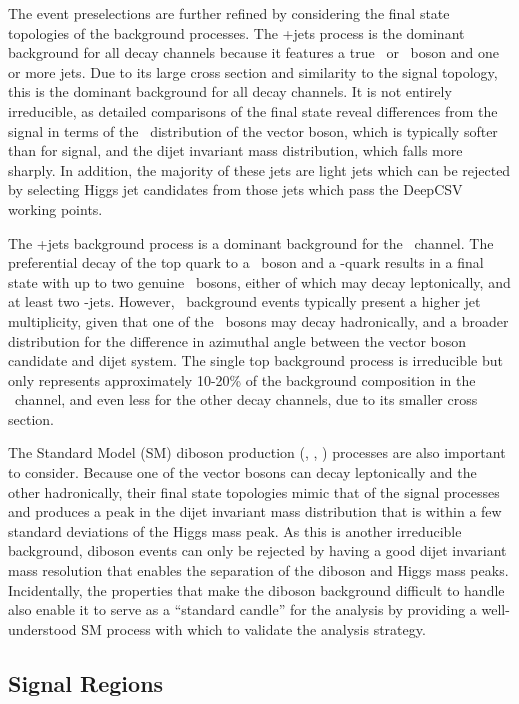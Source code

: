 The event preselections are further refined by considering the final state topologies of the background processes. The \bosV+jets process is the dominant background for all decay channels because it features a true \bosW\ or \bosZ\ boson and one or more jets. Due to its large cross section and similarity to the signal topology, this is the dominant background for all decay channels. It is not entirely irreducible, as detailed comparisons of the final state reveal differences from the signal in terms of the \pT\ distribution of the vector boson, which is typically softer than for signal, and the dijet invariant mass distribution, which falls more sharply. In addition, the majority of these jets are light jets which can be rejected by selecting Higgs jet candidates from those jets which pass the DeepCSV working points.

The \qrkt\qrktbar+jets background process is a dominant background for the \WlnH\ channel. The preferential decay of the top quark to a \bosW\ boson and a \qrkb-quark results in a final state with up to two genuine \bosW\ bosons, either of which may decay leptonically, and at least two \qrkb-jets. However, \qrkt\qrktbar\ background events typically present a higher jet multiplicity, given that one of the \bosW\ bosons may decay hadronically, and a broader distribution for the difference in azimuthal angle between the vector boson candidate and dijet system. The single top background process is irreducible but only represents approximately 10-20\% of the background composition in the \WlnH\ channel, and even less for the other decay channels, due to its smaller cross section.

The Standard Model (SM) diboson production (\bosW\bosW, \bosW\bosZ, \bosZ\bosZ) processes are also important to consider. Because one of the vector bosons can decay leptonically and the other hadronically, their final state topologies mimic that of the signal processes and produces a peak in the dijet invariant mass distribution that is within a few standard deviations of the Higgs mass peak. As this is another irreducible background, diboson events can only be rejected by having a good dijet invariant mass resolution that enables the separation of the diboson and Higgs mass peaks. Incidentally, the properties that make the diboson background difficult to handle also enable it to serve as a ``standard candle'' for the analysis by providing a well-understood SM process with which to validate the analysis strategy. 

\subsection{Signal Regions}

